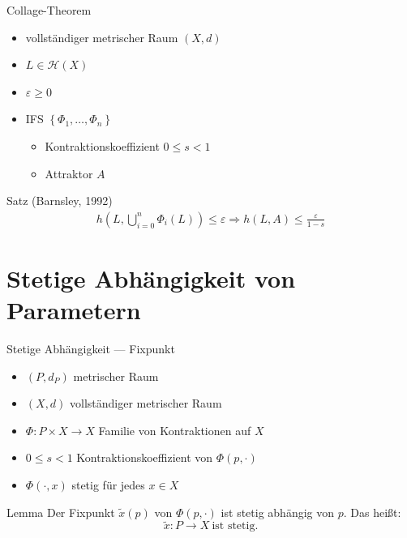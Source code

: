\documentclass[10pt]{beamer}
\renewcommand{\tilde}[1]{\widetilde{#1}}
\let\epsilon\varepsilon
\begin{document}
\begin{frame}{Collage-Theorem}
  \begin{itemize}
    \item vollständiger metrischer Raum \( (X,d) \)
    \item \( L \in \mathcal{H}(X) \)
    \item \( \epsilon \geq 0 \)
    \item IFS \( \left \{ \Phi_1,\dots,\Phi_n \right \} \)
    \begin{itemize}
      \item Kontraktionskoeffizient \( 0 \leq s < 1 \) 
      \item Attraktor \( A \)
    \end{itemize}
  \end{itemize}

  \begin{block}{Satz (Barnsley, 1992)}
    \begin{align*}
      h\left( L,\bigcup_{i=0}^n \Phi_i(L) \right) \leq \epsilon \Rightarrow h(L,A) \leq \frac{\epsilon}{1 - s}
    \end{align*}
  \end{block}
\end{frame}

\section{Stetige Abhängigkeit von Parametern}

\begin{frame}{Stetige Abhängigkeit --- Fixpunkt}
  \begin{itemize}
    \item \( (P, d_P) \) metrischer Raum
    \item \( (X,d) \) vollständiger metrischer Raum
    \item \( \Phi: P \times X \to X \) Familie von Kontraktionen auf \( X \)
    \item \( 0 \leq s < 1 \) Kontraktionskoeffizient von \( \Phi(p, \cdot) \)
    \item \( \Phi(\cdot, x) \) stetig für jedes \( x \in X \)
  \end{itemize}
  \begin{block}{Lemma}
    Der Fixpunkt \( \tilde{x}(p) \) von \( \Phi(p,\cdot) \) ist stetig abhängig von \( p \). Das heißt:
    \begin{equation*}
      \tilde{x} : P \to X \ \text{ist stetig.}
    \end{equation*}
  \end{block}
\end{frame}
\end{document}
